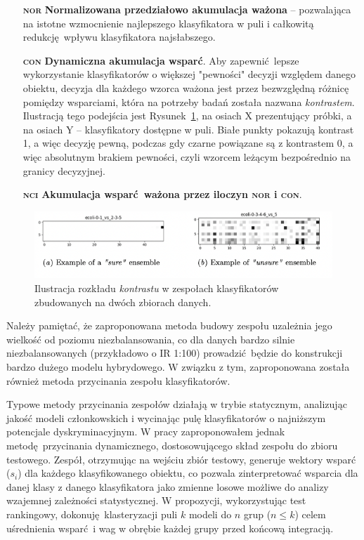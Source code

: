 \begin{itemize}
	\item[\bfseries\textsc{nor}] \textbf{Normalizowana przedziałowo akumulacja ważona} -- pozwalająca na istotne wzmocnienie najlepszego klasyfikatora w puli i całkowitą redukcję wpływu klasyfikatora najsłabszego.
	\item[\bfseries\textsc{con}] \textbf{Dynamiczna akumulacja wsparć}. Aby zapewnić lepsze wykorzystanie klasyfikatorów o większej "pewności" decyzji względem danego obiektu, decyzja dla każdego wzorca ważona jest przez bezwzględną różnicę pomiędzy wsparciami, która na potrzeby badań została nazwana \emph{kontrastem}. Ilustracją tego podejścia jest Rysunek~\ref{fig:contrast}, na osiach X prezentujący próbki, a na osiach Y -- klasyfikatory dostępne w puli. Białe punkty pokazują kontrast 1, a więc decyzję pewną, podczas gdy czarne powiązane są z kontrastem 0, a więc absolutnym brakiem pewności, czyli wzorcem leżącym bezpośrednio na granicy decyzyjnej.
	\item[\bfseries\textsc{nci}] \textbf{Akumulacja wsparć ważona przez iloczyn \textsc{nor} i \textsc{con}}.
\end{itemize}

\begin{figure}[!htb]
	\vspace{-1em}\centering
	\includegraphics[width=\textwidth]{figures/contrast}
	\caption{Ilustracja rozkładu \emph{kontrastu} w zespołach klasyfikatorów zbudowanych na dwóch zbiorach danych.}\label{fig:contrast}
	\vspace{-2em}
\end{figure} 

Należy pamiętać, że zaproponowana metoda budowy zespołu uzależnia jego wielkość od poziomu niezbalansowania, co dla danych bardzo silnie niezbalansowanych (przykładowo o IR 1:100) prowadzić będzie do konstrukcji bardzo dużego modelu hybrydowego. W związku z tym, zaproponowana została również metoda przycinania zespołu klasyfikatorów.

Typowe metody przycinania zespołów działają w trybie statycznym, analizując jakość modeli członkowskich i wycinając pulę klasyfikatorów o najniższym potencjale dyskryminacyjnym. W pracy zaproponowałem jednak metodę przycinania dynamicznego, dostosowującego skład zespołu do zbioru testowego. Zespół, otrzymując na wejściu zbiór testowy, generuje wektory wsparć ($s_i$) dla każdego klasyfikowanego obiektu, co pozwala zinterpretować wsparcia dla danej klasy z danego klasyfikatora jako zmienne losowe możliwe do analizy wzajemnej zależności statystycznej. W propozycji, wykorzystując test rankingowy, dokonuję klasteryzacji puli $k$ modeli do $n$ grup ($n \leq k$) celem uśrednienia wsparć i wag w obrębie każdej grupy przed końcową integracją. 


